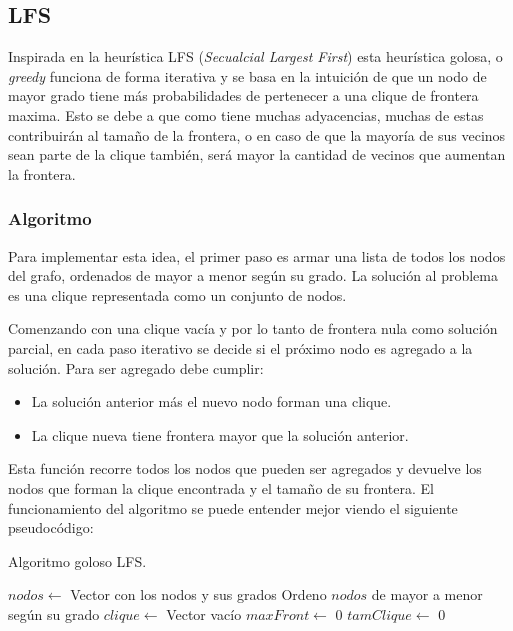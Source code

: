 \subsection{LFS}

Inspirada en la heurística LFS (\textit{Secualcial Largest First})  esta heurística golosa, o \textit{greedy} funciona de forma iterativa y se basa en la intuición de que un nodo de mayor grado tiene más probabilidades de pertenecer a una clique de frontera maxima. Esto se debe a que como tiene muchas adyacencias, muchas de estas contribuirán al tamaño de la frontera, o en caso de que la mayoría de sus vecinos sean parte de la clique también, será mayor la cantidad de vecinos que aumentan la frontera.

\subsubsection{Algoritmo}

Para implementar esta idea, el primer paso es armar una lista de todos los nodos del grafo, ordenados de mayor a menor según su grado. La solución al problema es una clique representada como un conjunto de nodos.

Comenzando con una clique vacía y por lo tanto de frontera nula como solución parcial, en cada paso iterativo se decide si el próximo nodo es agregado a la solución. Para ser agregado debe cumplir:

\begin{itemize}
\item La solución anterior más el nuevo nodo forman una clique.
\item La clique nueva tiene frontera mayor que la solución anterior.
\end{itemize}

Esta función recorre todos los nodos que pueden ser agregados y devuelve los nodos que forman la clique encontrada y el tamaño de su frontera. El funcionamiento del algoritmo se puede entender mejor viendo el siguiente pseudocódigo:\\


\begin{algorithm}[H]
\begin{algorithmic}
\caption{Algoritmo goloso LFS.}
		\State{}
		$nodos \gets$ Vector con los nodos y sus grados \;
		Ordeno $nodos$ de mayor a menor según su grado\;
		$clique \gets$ Vector vacío\;
		$maxFront \gets$ 0\;
		$tamClique \gets$ 0\;
		
	\EndFunction
\end{algorithmic}
\end{algorithm}



